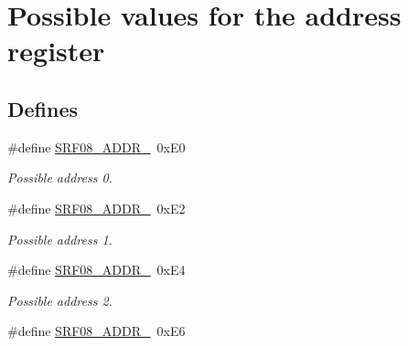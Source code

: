 \hypertarget{group___s_r_f08___a_d_d_r_e_s_s_e_s}{\section{\-Possible values for the address register}
\label{group___s_r_f08___a_d_d_r_e_s_s_e_s}
}
\subsection*{\-Defines}
\begin{DoxyCompactItemize}
\item 
\hypertarget{group___s_r_f08___a_d_d_r_e_s_s_e_s_gadf04d6ea3fb1e38d041300a9ac29d6c3}{\#define \hyperlink{group___s_r_f08___a_d_d_r_e_s_s_e_s_gadf04d6ea3fb1e38d041300a9ac29d6c3}{\-S\-R\-F08\-\_\-\-A\-D\-D\-R\-\_}~0x\-E0}\label{group___s_r_f08___a_d_d_r_e_s_s_e_s_gadf04d6ea3fb1e38d041300a9ac29d6c3}

\begin{DoxyCompactList}\small\item\em \-Possible address 0. \end{DoxyCompactList}\item 
\hypertarget{group___s_r_f08___a_d_d_r_e_s_s_e_s_ga2f08f6c270f6b8b58f4d9d16c897aae3}{\#define \hyperlink{group___s_r_f08___a_d_d_r_e_s_s_e_s_ga2f08f6c270f6b8b58f4d9d16c897aae3}{\-S\-R\-F08\-\_\-\-A\-D\-D\-R\-\_}~0x\-E2}\label{group___s_r_f08___a_d_d_r_e_s_s_e_s_ga2f08f6c270f6b8b58f4d9d16c897aae3}

\begin{DoxyCompactList}\small\item\em \-Possible address 1. \end{DoxyCompactList}\item 
\hypertarget{group___s_r_f08___a_d_d_r_e_s_s_e_s_gaecce93dd8641a1e7767dbc2d60d9841c}{\#define \hyperlink{group___s_r_f08___a_d_d_r_e_s_s_e_s_gaecce93dd8641a1e7767dbc2d60d9841c}{\-S\-R\-F08\-\_\-\-A\-D\-D\-R\-\_}~0x\-E4}\label{group___s_r_f08___a_d_d_r_e_s_s_e_s_gaecce93dd8641a1e7767dbc2d60d9841c}

\begin{DoxyCompactList}\small\item\em \-Possible address 2. \end{DoxyCompactList}\item 
\hypertarget{group___s_r_f08___a_d_d_r_e_s_s_e_s_ga0fcf883663e6b64b1b8b26504898cd91}{\#define \hyperlink{group___s_r_f08___a_d_d_r_e_s_s_e_s_ga0fcf883663e6b64b1b8b26504898cd91}{\-S\-R\-F08\-\_\-\-A\-D\-D\-R\-\_}~0x\-E6}\label{group___s_r_f08___a_d_d_r_e_s_s_e_s_ga0fcf883663e6b64b1b8b26504898cd91}


\end{DoxyCompactItemize}
